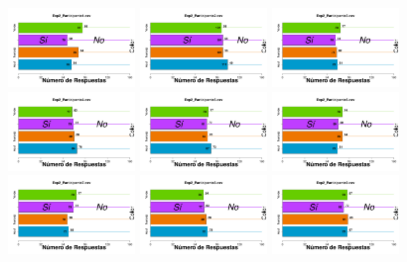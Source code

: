 \documentclass[a4paper ]{article}
\begin{document}
\begin{figure}[th]
\centering
\includegraphics[width=0.3\textwidth]{Figures/BiasColor_Exp2_P1} \includegraphics[width=0.3\textwidth]{Figures/BiasColor_Exp2_P2} \includegraphics[width=0.3\textwidth]{Figures/BiasColor_Exp2_P3}
\includegraphics[width=0.3\textwidth]{Figures/BiasColor_Exp2_P4} \includegraphics[width=0.3\textwidth]{Figures/BiasColor_Exp2_P5} \includegraphics[width=0.3\textwidth]{Figures/BiasColor_Exp2_P6}
\includegraphics[width=0.3\textwidth]{Figures/BiasColor_Exp2_P7} \includegraphics[width=0.3\textwidth]{Figures/BiasColor_Exp2_P8} \includegraphics[width=0.3\textwidth]{Figures/BiasColor_Exp2_P9}

\end{figure}
\end{document}
